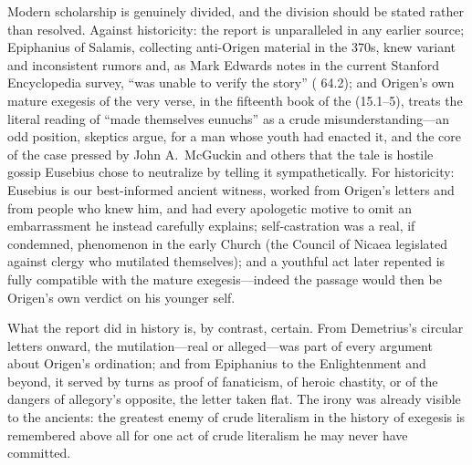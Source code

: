 Modern scholarship is genuinely divided, and the division should be stated
rather than resolved. Against historicity: the report is unparalleled in any
earlier source; Epiphanius of Salamis, collecting anti-Origen material in
the 370s, knew variant and inconsistent rumors and, as Mark Edwards notes in
the current Stanford Encyclopedia survey, ``was unable to verify the story''
( 64.2); and Origen's own mature exegesis of the very verse,
in the fifteenth book of the  (15.1--5), treats
the literal reading of ``made themselves eunuchs'' as a crude
misunderstanding---an odd position, skeptics argue, for a man whose youth
had enacted it, and the core of the case pressed by John A.\ McGuckin and
others that the tale is hostile gossip Eusebius chose to neutralize by
telling it sympathetically. For historicity: Eusebius is our best-informed
ancient witness, worked from Origen's letters and from people who knew him,
and had every apologetic motive to omit an embarrassment he instead
carefully explains; self-castration was a real, if condemned, phenomenon in
the early Church (the Council of Nicaea legislated against clergy who
mutilated themselves); and a youthful act later repented is fully compatible
with the mature exegesis---indeed the  passage would then
be Origen's own verdict on his younger self.


What the report did in history is, by contrast, certain. From Demetrius's
circular letters onward, the mutilation---real or alleged---was part of every
argument about Origen's ordination; and from Epiphanius to the Enlightenment
and beyond, it served by turns as proof of fanaticism, of heroic chastity,
or of the dangers of allegory's opposite, the letter taken flat. The irony
was already visible to the ancients: the greatest enemy of crude literalism
in the history of exegesis is remembered above all for one act of crude
literalism he may never have committed.
